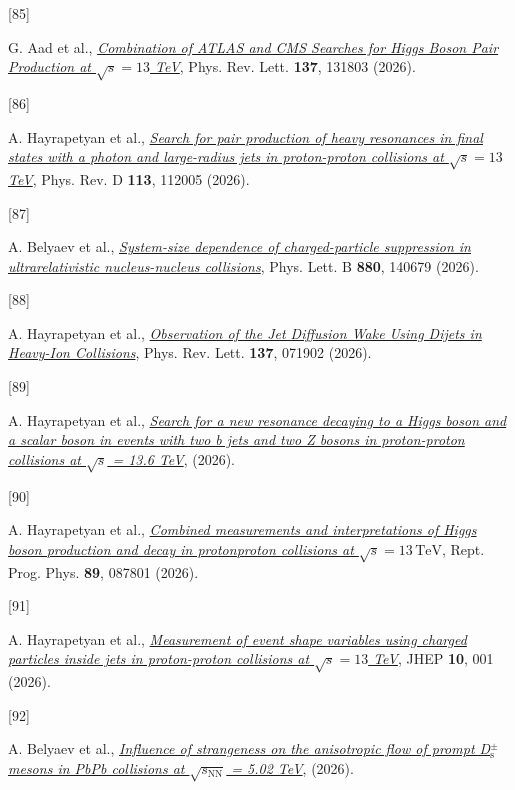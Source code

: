 \documentclass[
]{article}
\newlength{\cslhangindent}
\newlength{\csllabelwidth}
\newenvironment{CSLReferences}[2] %
 {\begin{list}{}{%
  \setlength{\itemindent}{0pt}
  \setlength{\leftmargin}{0pt}
  \setlength{\parsep}{0pt}
  \ifodd #1
   \setlength{\leftmargin}{\cslhangindent}
   \setlength{\itemindent}{-1\cslhangindent}
  \fi
  \setlength{\itemsep}{#2\baselineskip}}}
 {\end{list}}
\newcommand{\CSLLeftMargin}[1]{\parbox[t]{\csllabelwidth}{\strut#1\strut}}
\newcommand{\CSLRightInline}[1]{\parbox[t]{\linewidth - \csllabelwidth}{\strut#1\strut}}
\begin{document}
\begin{CSLReferences}{0}{0}
\CSLLeftMargin{{[}85{]} }%
\CSLRightInline{G. Aad et al.,
\emph{\href{https://doi.org/10.1103/27s7-2frt}{{Combination of ATLAS and
CMS Searches for Higgs Boson Pair Production at \(\sqrt{s}=13\) TeV}}},
Phys. Rev. Lett. \textbf{137}, 131803 (2026).}

\CSLLeftMargin{{[}86{]} }%
\CSLRightInline{A. Hayrapetyan et al.,
\emph{\href{https://doi.org/10.1103/bwqs-vgqn}{{Search for pair
production of heavy resonances in final states with a photon and
large-radius jets in proton-proton collisions at \(\sqrt{s}=13\) TeV}}},
Phys. Rev. D \textbf{113}, 112005 (2026).}

\CSLLeftMargin{{[}87{]} }%
\CSLRightInline{A. Belyaev et al.,
\emph{\href{https://doi.org/10.1016/j.physletb.2026.140679}{{System-size
dependence of charged-particle suppression in ultrarelativistic
nucleus-nucleus collisions}}}, Phys. Lett. B \textbf{880}, 140679
(2026).}

\CSLLeftMargin{{[}88{]} }%
\CSLRightInline{A. Hayrapetyan et al.,
\emph{\href{https://doi.org/10.1103/g49y-8cjl}{{Observation of the Jet
Diffusion Wake Using Dijets in Heavy-Ion Collisions}}}, Phys. Rev. Lett.
\textbf{137}, 071902 (2026).}

\CSLLeftMargin{{[}89{]} }%
\CSLRightInline{A. Hayrapetyan et al.,
\emph{\href{https://arxiv.org/abs/2602.18223}{{Search for a new
resonance decaying to a Higgs boson and a scalar boson in events with
two b jets and two Z bosons in proton-proton collisions at \(\sqrt{s}\)
= 13.6 TeV}}}, (2026).}

\CSLLeftMargin{{[}90{]} }%
\CSLRightInline{A. Hayrapetyan et al.,
\emph{\href{https://doi.org/10.1088/1361-6633/ae72c4}{{Combined
measurements and interpretations of Higgs boson production and decay in
proton{\textendash}proton collisions at
\(\sqrt{s} = 13\,\textrm{TeV}\)}}}, Rept. Prog. Phys. \textbf{89},
087801 (2026).}

\CSLLeftMargin{{[}91{]} }%
\CSLRightInline{A. Hayrapetyan et al.,
\emph{\href{https://doi.org/10.1007/JHEP10(2026)001}{{Measurement of
event shape variables using charged particles inside jets in
proton-proton collisions at \(\sqrt{s}=13\) TeV}}}, JHEP \textbf{10},
001 (2026).}

\CSLLeftMargin{{[}92{]} }%
\CSLRightInline{A. Belyaev et al.,
\emph{\href{https://arxiv.org/abs/2602.14221}{{Influence of strangeness
on the anisotropic flow of prompt D\(^\pm_\mathrm{s}\) mesons in PbPb
collisions at \(\sqrt{s_\mathrm{NN}}\) = 5.02 TeV}}}, (2026).}


\end{CSLReferences}
\end{document}
